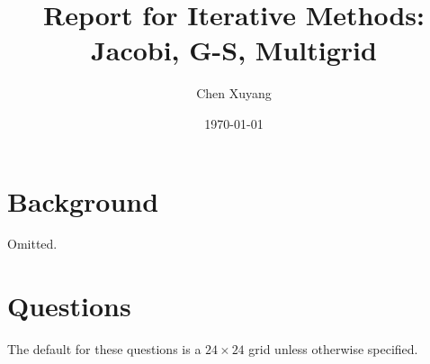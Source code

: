 \documentclass{assignment}[2019/10/15]
\title{Report for Iterative Methods: Jacobi, G-S, Multigrid}
\author{Chen Xuyang}
\date{\today}
\institute{School of Mathematical Science}
\begin{document}
    \maketitle
    \tableofcontents
    \clearpage

    \section{Background}

    Omitted.

    \section{Questions}

    The default for these questions is a $24\times 24$ grid unless otherwise specified.
\end{document}
